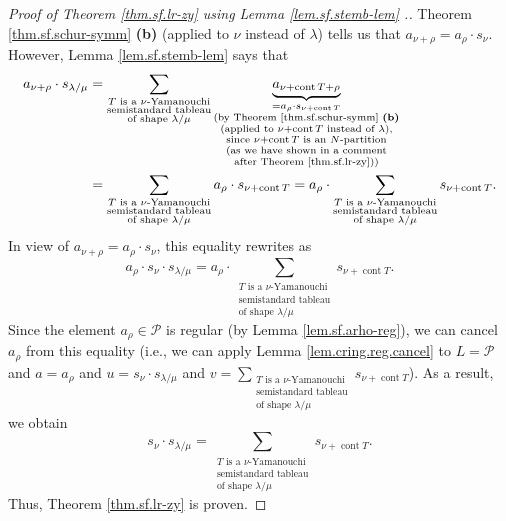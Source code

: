 \begin{proof}
[Proof of Theorem \ref{thm.sf.lr-zy} using Lemma \ref{lem.sf.stemb-lem}%
.]Theorem \ref{thm.sf.schur-symm} \textbf{(b)} (applied to $\nu$ instead of
$\lambda$) tells us that $a_{\nu+\rho}=a_{\rho}\cdot s_{\nu}$. However, Lemma
\ref{lem.sf.stemb-lem} says that%
\begin{align*}
a_{\nu+\rho}\cdot s_{\lambda/\mu}  &  =\sum_{\substack{T\text{ is a }%
\nu\text{-Yamanouchi}\\\text{semistandard tableau}\\\text{of shape }%
\lambda/\mu}}\underbrace{a_{\nu+\operatorname*{cont}T+\rho}}%
_{\substack{=a_{\rho}\cdot s_{\nu+\operatorname*{cont}T}\\\text{(by Theorem
\ref{thm.sf.schur-symm} \textbf{(b)}}\\\text{(applied to }\nu
+\operatorname*{cont}T\text{ instead of }\lambda\text{),}\\\text{since }%
\nu+\operatorname*{cont}T\text{ is an }N\text{-partition}\\\text{(as we have
shown in a comment}\\\text{after Theorem \ref{thm.sf.lr-zy}))}}}\\
&  =\sum_{\substack{T\text{ is a }\nu\text{-Yamanouchi}\\\text{semistandard
tableau}\\\text{of shape }\lambda/\mu}}a_{\rho}\cdot s_{\nu
+\operatorname*{cont}T}=a_{\rho}\cdot\sum_{\substack{T\text{ is a }%
\nu\text{-Yamanouchi}\\\text{semistandard tableau}\\\text{of shape }%
\lambda/\mu}}s_{\nu+\operatorname*{cont}T}.
\end{align*}
In view of $a_{\nu+\rho}=a_{\rho}\cdot s_{\nu}$, this equality rewrites as%
\[
a_{\rho}\cdot s_{\nu}\cdot s_{\lambda/\mu}=a_{\rho}\cdot\sum
_{\substack{T\text{ is a }\nu\text{-Yamanouchi}\\\text{semistandard
tableau}\\\text{of shape }\lambda/\mu}}s_{\nu+\operatorname*{cont}T}.
\]
Since the element $a_{\rho}\in\mathcal{P}$ is regular (by Lemma
\ref{lem.sf.arho-reg}), we can cancel $a_{\rho}$ from this equality (i.e., we
can apply Lemma \ref{lem.cring.reg.cancel} to $L=\mathcal{P}$ and $a=a_{\rho}$
and $u=s_{\nu}\cdot s_{\lambda/\mu}$ and $v=\sum_{\substack{T\text{ is a }%
\nu\text{-Yamanouchi}\\\text{semistandard tableau}\\\text{of shape }%
\lambda/\mu}}s_{\nu+\operatorname*{cont}T}$). As a result, we obtain%
\[
s_{\nu}\cdot s_{\lambda/\mu}=\sum_{\substack{T\text{ is a }\nu
\text{-Yamanouchi}\\\text{semistandard tableau}\\\text{of shape }\lambda/\mu
}}s_{\nu+\operatorname*{cont}T}.
\]
Thus, Theorem \ref{thm.sf.lr-zy} is proven.
\end{proof}

